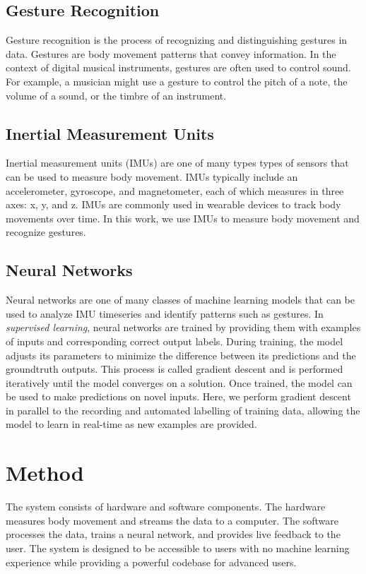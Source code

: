\documentclass{nime-alternate} %
\begin{document}
\subsection{Gesture Recognition}
Gesture recognition is the process of recognizing and distinguishing gestures in data. Gestures are body movement patterns that convey information. In the context of digital musical instruments, gestures are often used to control sound. For example, a musician might use a gesture to control the pitch of a note, the volume of a sound, or the timbre of an instrument.

\subsection{Inertial Measurement Units}
Inertial measurement units (IMUs) are one of many types types of sensors that can be used to measure body movement. IMUs typically include an accelerometer, gyroscope, and magnetometer, each of which measures in three axes: x, y, and z. IMUs are commonly used in wearable devices to track body movements over time. In this work, we use IMUs to measure body movement and recognize gestures.

\subsection{Neural Networks}
Neural networks are one of many classes of machine learning models that can be used to analyze IMU timeseries and identify patterns such as gestures. In \textit{supervised learning}, neural networks are trained by providing them with examples of inputs and corresponding correct output labels. During training, the model adjusts its parameters to minimize the difference between its predictions and the groundtruth outputs. This process is called gradient descent and is performed iteratively until the model converges on a solution. Once trained, the model can be used to make predictions on novel inputs. Here, we perform gradient descent in parallel to the recording and automated labelling of training data, allowing the model to learn in real-time as new examples are provided.

\section{Method}
The system consists of hardware and software components. The hardware measures body movement and streams the data to a computer. The software processes the data, trains a neural network, and provides live feedback to the user. The system is designed to be accessible to users with no machine learning experience while providing a powerful codebase for advanced users.
\end{document}
